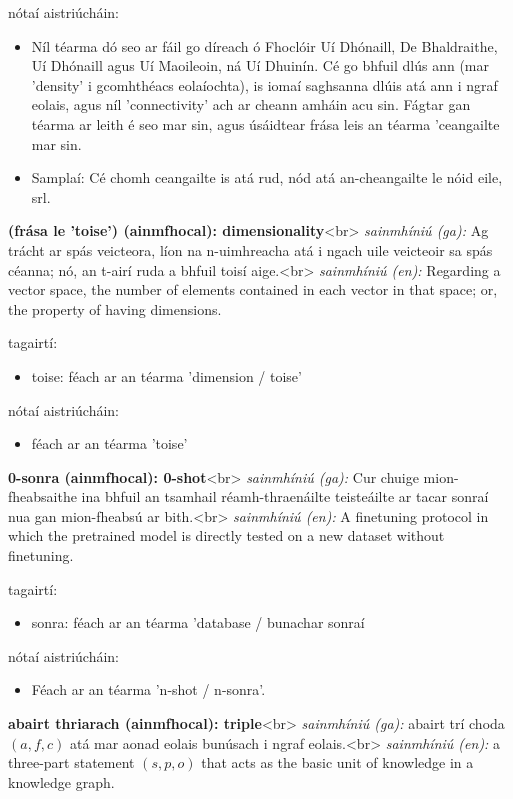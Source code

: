 \documentclass{article}
\begin{document}
nótaí aistriúcháin:
\begin{itemize}
	\item Níl téarma dó seo ar fáil go díreach ó Fhoclóir Uí Dhónaill, De Bhaldraithe, Uí Dhónaill agus Uí Maoileoin, ná Uí Dhuinín. Cé go bhfuil dlús ann (mar 'density' i gcomhthéacs eolaíochta), is iomaí saghsanna dlúis atá ann i ngraf eolais, agus níl 'connectivity' ach ar cheann amháin acu sin. Fágtar gan téarma ar leith é seo mar sin, agus úsáidtear frása leis an téarma 'ceangailte mar sin.
	\item Samplaí: Cé chomh ceangailte is atá rud, nód atá an-cheangailte le nóid eile, srl.
\end{itemize}


\textbf{(frása le 'toise') (ainmfhocal): dimensionality}<br>
\textit{sainmhíniú (ga):} Ag trácht ar spás veicteora, líon na n-uimhreacha atá i ngach uile veicteoir sa spás céanna; nó, an t-airí ruda a bhfuil toisí aige.<br>
\textit{sainmhíniú (en):} Regarding a vector space, the number of elements contained in each vector in that space; or, the property of having dimensions.

tagairtí:
\begin{itemize}
	\item toise: féach ar an téarma 'dimension / toise'
\end{itemize}

nótaí aistriúcháin:
\begin{itemize}
	\item féach ar an téarma 'toise'
\end{itemize}


\textbf{0-sonra (ainmfhocal): 0-shot}<br>
\textit{sainmhíniú (ga):} Cur chuige mion-fheabsaithe ina bhfuil an tsamhail réamh-thraenáilte teisteáilte ar tacar sonraí nua gan mion-fheabsú ar bith.<br>
\textit{sainmhíniú (en):} A finetuning protocol in which the pretrained model is directly tested on a new dataset without finetuning.

tagairtí:
\begin{itemize}
	\item sonra: féach ar an téarma 'database / bunachar sonraí
\end{itemize}

nótaí aistriúcháin:
\begin{itemize}
	\item Féach ar an téarma 'n-shot / n-sonra'.
\end{itemize}


\textbf{abairt thriarach (ainmfhocal): triple}<br>
\textit{sainmhíniú (ga):} abairt trí choda $(a,f,c)$ atá mar aonad eolais bunúsach i ngraf eolais.<br>
\textit{sainmhíniú (en):} a three-part statement $(s,p,o)$ that acts as the basic unit of knowledge in a knowledge graph.
\end{document}
